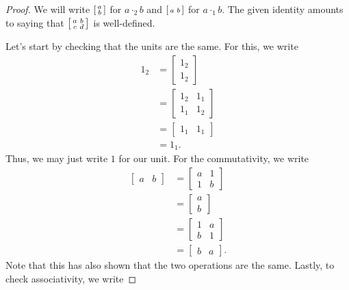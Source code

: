 \documentclass[../notes.tex]{subfiles}
\begin{document}
\begin{proof}
	We will write $\begin{bsmallmatrix}
		a \\ b
	\end{bsmallmatrix}$ for $a\cdot_2b$ and $\begin{bsmallmatrix}
		a & b
	\end{bsmallmatrix}$ for $a\cdot_1b$. The given identity amounts to saying that $\begin{bsmallmatrix}
		a & b \\ c & d
	\end{bsmallmatrix}$ is well-defined.

	Let's start by checking that the units are the same. For this, we write
	\begin{align*}
		1_2 &= \begin{bmatrix}
			1_2 \\ 1_2
		\end{bmatrix} \\
		&= \begin{bmatrix}
			1_2 & 1_1 \\
			1_1 & 1_2
		\end{bmatrix} \\
		&= \begin{bmatrix}
			1_1 & 1_1
		\end{bmatrix} \\
		&= 1_1.
	\end{align*}
	Thus, we may just write $1$ for our unit. For the commutativity, we write
	\begin{align*}
		\begin{bmatrix}
			a & b
		\end{bmatrix} &= \begin{bmatrix}
			a & 1 \\
			1 & b
		\end{bmatrix} \\
		&= \begin{bmatrix}
			a \\ b
		\end{bmatrix} \\
		&= \begin{bmatrix}
			1 & a \\
			b & 1
		\end{bmatrix} \\
		&= \begin{bmatrix}
			b & a
		\end{bmatrix}.
	\end{align*}
	Note that this has also shown that the two operations are the same. Lastly, to check associativity, we write

\end{proof}
\end{document}
